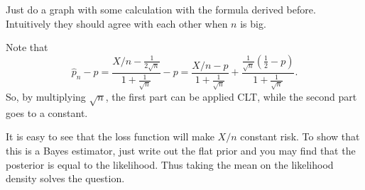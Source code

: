 \documentclass[12pt]{article}
\newcommand{\1}{\mathbbm{1}}
\newenvironment{exercise}[2][Exercise]{\begin{trivlist}
\item[\hskip \labelsep {\bfseries #1}\hskip \labelsep {\bfseries #2.}]}{\end{trivlist}}
\begin{document}
\begin{exercise}{5.8.1.12}
\end{exercise}

Just do a graph with some calculation with the formula derived before. Intuitively they should agree with each other when $n$ is big.

\begin{exercise}{Asymptotic analysis of the minimax estimator}
\end{exercise}
Note that
$$
\hat{p}_n - p = \frac{X/n - \frac{1}{2\sqrt{n} }}{1 + \frac{1}{\sqrt{n}}} - p
= \frac{X/n - p}{1 + \frac{1}{\sqrt{n}}} + \frac{\frac{1}{\sqrt{n}}(\frac{1}{2} - p) }{1 + \frac{1}{\sqrt{n}}}.
$$
So, by multiplying $\sqrt{n}$, the first part can be applied CLT, while the second part goes to a constant.

\begin{exercise}{Change a loss function to make $X/n$ minimax}
\end{exercise}

It is easy to see that the loss function will make $X/n$ constant risk. To show that this is a Bayes estimator, just write out the flat prior and you may find that the posterior is equal to the likelihood. Thus taking the mean on the likelihood density solves the question.
\end{document}

